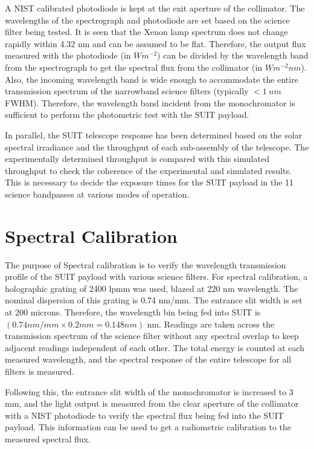 \documentclass[12pt]{spieman}  %
\begin{document}
	A NIST calibrated photodiode is kept at the exit aperture of the collimator. The wavelengths of the spectrograph and photodiode are set based on the science filter being tested. It is seen that the Xenon lamp spectrum does not change rapidly within 4.32 nm and can be assumed to be flat. Therefore, the output flux measured with the photodiode (in $Wm^{-2}$) can be divided by the wavelength band from the spectrograph to get the spectral flux from the collimator (in $W m^{-2} nm$). Also, the incoming wavelength band is wide enough to accommodate the entire transmission spectrum of the narrowband science filters (typically $< 1~nm$ FWHM). Therefore, the wavelength band incident from the monochromator is sufficient to perform the photometric test with the SUIT payload.
		
	In parallel, the SUIT telescope response has been determined based on the solar spectral irradiance and the throughput of each sub-assembly of the telescope. The experimentally determined throughput is compared with this simulated throughput to check the coherence of the experimental and simulated results. This is necessary to decide the exposure times for the SUIT payload in the 11 science bandpasses at various modes of operation.
	
	\section{Spectral Calibration}
	
	The purpose of Spectral calibration is to verify the wavelength transmission profile of the SUIT payload with various science filters. For spectral calibration, a holographic grating of 2400 lpmm was used, blazed at 220 nm wavelength. The nominal dispersion of this grating is 0.74 nm/mm. The entrance slit width is set at 200 microns. Therefore, the wavelength bin being fed into SUIT is $(0.74 nm/mm \times 0.2 mm= 0.148 nm)$ nm. Readings are taken across the transmission spectrum of the science filter without any spectral overlap to keep adjacent readings independent of each other. The total energy is counted at each measured wavelength, and the spectral response of the entire telescope for all filters is measured.
	
	Following this, the entrance slit width of the monochromator is increased to 3 mm, and the light output is measured from the clear aperture of the collimator with a NIST photodiode to verify the spectral flux being fed into the SUIT payload. This information can be used to get a radiometric calibration to the measured spectral flux.
\end{document}

